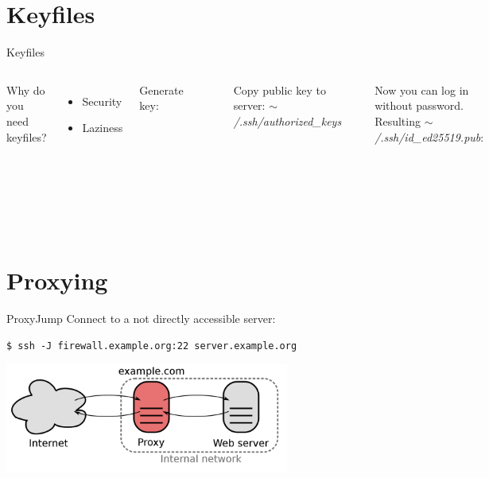\documentclass[10pt,graphics,aspectratio=169,table]{beamer}
\begin{document}
\section{Keyfiles}
\begin{frame}[fragile]{Keyfiles}
\begin{columns}
	Why do you need keyfiles?
	\begin{itemize}
		\item Security
		\item Laziness
	\end{itemize}
	Generate key:
	\begin{lstlisting}
$ ssh-keygen -t ed25519 -C me@mypc
	\end{lstlisting}
	\begin{lstlisting}
$ ssh-keygen -b 4096 -t rsa
	\end{lstlisting}
	Copy public key to server: \textit{$\sim$/.ssh/authorized\_keys}
	\begin{lstlisting}
$ ssh-copy-id my@example.com
	\end{lstlisting}
	Now you can log in without password.
	Resulting \textit{$\sim$/.ssh/id\_ed25519.pub}:
	\begin{lstlisting}
ssh-ed25519 AAAAC3NzaC1lZ
DI1NTE5AAAAIJDzhzcMdEg7Nz
wwgB0bdOP1pDSKv5fsN4l4q8Y
ysLLX viktor@nerd101
	\end{lstlisting}
\end{columns}
\end{frame}

\section{Proxying}
\begin{frame}[fragile]{ProxyJump}
	Connect to a not directly accessible server:
	\begin{lstlisting}
$ ssh -J firewall.example.org:22 server.example.org
	\end{lstlisting}
	\begin{center}
		\includegraphics[width=0.7\textwidth]{img/proxy.png} \cite{proxy}
	\end{center}
\end{frame}
\end{document}

